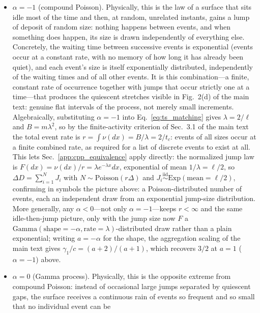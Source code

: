 \documentclass[preprint,12pt]{elsarticle}
\begin{document}
\begin{itemize}
  \item $\alpha=-1$ (compound Poisson). Physically, this is the law of a
    surface that sits idle most of the time and then, at random, unrelated
    instants, gains a lump of deposit of random size: nothing happens
    between events, and when something does happen, its size is drawn
    independently of everything else. Concretely, the waiting time between
    successive events is exponential (events occur at a constant rate, with
    no memory of how long it has already been quiet), and each event's size
    is itself exponentially distributed, independently of the waiting
    times and of all other events. It is this combination---a finite,
    constant rate of occurrence together with jumps that occur strictly one
    at a time---that produces the quiescent stretches visible in Fig.~2(d)
    of the main text: genuine flat intervals of the process, not merely
    small increments. Algebraically, substituting $\alpha=-1$ into
    Eq.~\eqref{eq:ts_matching} gives $\lambda=2/\ell$ and
    $B=m\lambda^2$, so by the finite-activity criterion of
    Sec.~3.1 of the main text the total event rate is
    $r=\int\nu(dx)=B/\lambda=2/t_c$: events of all sizes occur at a finite
    combined rate, as required for a list of discrete events to exist at
    all. This lets
    Sec.~\ref{app:cpp_equivalence} apply directly: the normalized
    jump law is $F(dx)=\nu(dx)/r=\lambda e^{-\lambda x}dx$, exponential of
    mean $1/\lambda=\ell/2$, so $\Delta D=\sum_{i=1}^{N}J_i$ with
    $N\sim\mathrm{Poisson}(r\Delta)$ and $J_i\stackrel{\mathrm{iid}}{\sim}\mathrm{Exp}(\mathrm{mean}=\ell/2)$,
    confirming in symbols the picture above: a Poisson-distributed number
    of events, each an independent draw from an exponential jump-size
    distribution. More generally, any
    $\alpha<0$---not only $\alpha=-1$---keeps $r<\infty$ and
    the same idle-then-jump picture, only with the jump size now
    $F$ a $\mathrm{Gamma}(\mathrm{shape}=-\alpha,\mathrm{rate}=\lambda)$-distributed
    draw rather than a plain exponential; writing $a=-\alpha$ for the shape, the aggregation scaling of the main text
    gives $\gamma_1/c=(a+2)/(a+1)$, which recovers $3/2$ at $a=1$
    ($\alpha=-1$) above.
  \item $\alpha=0$ (Gamma process). Physically, this is the opposite
    extreme from compound Poisson: instead of occasional large jumps
    separated by quiescent gaps, the surface receives a continuous rain of
    events so frequent and so small that no individual event can be

\end{itemize}
\end{document}
